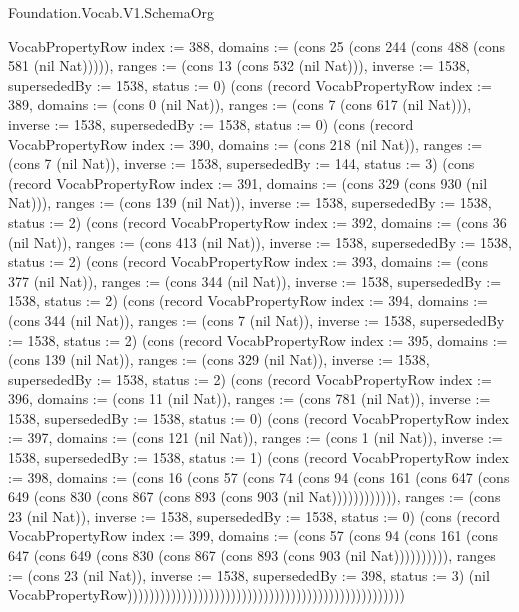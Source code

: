 \begin{lexlean}{Foundation.Vocab.V1.SchemaOrg}
\begin{semanticmodule}
{VocabPropertyRow {index := 388, domains := (cons 25 (cons 244 (cons 488 (cons 581 (nil Nat))))), ranges := (cons 13 (cons 532 (nil Nat))), inverse := 1538, supersededBy := 1538, status := 0}) (cons (record VocabPropertyRow {index := 389, domains := (cons 0 (nil Nat)), ranges := (cons 7 (cons 617 (nil Nat))), inverse := 1538, supersededBy := 1538, status := 0}) (cons (record VocabPropertyRow {index := 390, domains := (cons 218 (nil Nat)), ranges := (cons 7 (nil Nat)), inverse := 1538, supersededBy := 144, status := 3}) (cons (record VocabPropertyRow {index := 391, domains := (cons 329 (cons 930 (nil Nat))), ranges := (cons 139 (nil Nat)), inverse := 1538, supersededBy := 1538, status := 2}) (cons (record VocabPropertyRow {index := 392, domains := (cons 36 (nil Nat)), ranges := (cons 413 (nil Nat)), inverse := 1538, supersededBy := 1538, status := 2}) (cons (record VocabPropertyRow {index := 393, domains := (cons 377 (nil Nat)), ranges := (cons 344 (nil Nat)), inverse := 1538, supersededBy := 1538, status := 2}) (cons (record VocabPropertyRow {index := 394, domains := (cons 344 (nil Nat)), ranges := (cons 7 (nil Nat)), inverse := 1538, supersededBy := 1538, status := 2}) (cons (record VocabPropertyRow {index := 395, domains := (cons 139 (nil Nat)), ranges := (cons 329 (nil Nat)), inverse := 1538, supersededBy := 1538, status := 2}) (cons (record VocabPropertyRow {index := 396, domains := (cons 11 (nil Nat)), ranges := (cons 781 (nil Nat)), inverse := 1538, supersededBy := 1538, status := 0}) (cons (record VocabPropertyRow {index := 397, domains := (cons 121 (nil Nat)), ranges := (cons 1 (nil Nat)), inverse := 1538, supersededBy := 1538, status := 1}) (cons (record VocabPropertyRow {index := 398, domains := (cons 16 (cons 57 (cons 74 (cons 94 (cons 161 (cons 647 (cons 649 (cons 830 (cons 867 (cons 893 (cons 903 (nil Nat)))))))))))), ranges := (cons 23 (nil Nat)), inverse := 1538, supersededBy := 1538, status := 0}) (cons (record VocabPropertyRow {index := 399, domains := (cons 57 (cons 94 (cons 161 (cons 647 (cons 649 (cons 830 (cons 867 (cons 893 (cons 903 (nil Nat)))))))))), ranges := (cons 23 (nil Nat)), inverse := 1538, supersededBy := 398, status := 3}) (nil VocabPropertyRow)))))))))))))))))))))))))))))))))))))))))))))))))))
}


\end{semanticmodule}
\end{lexlean}
